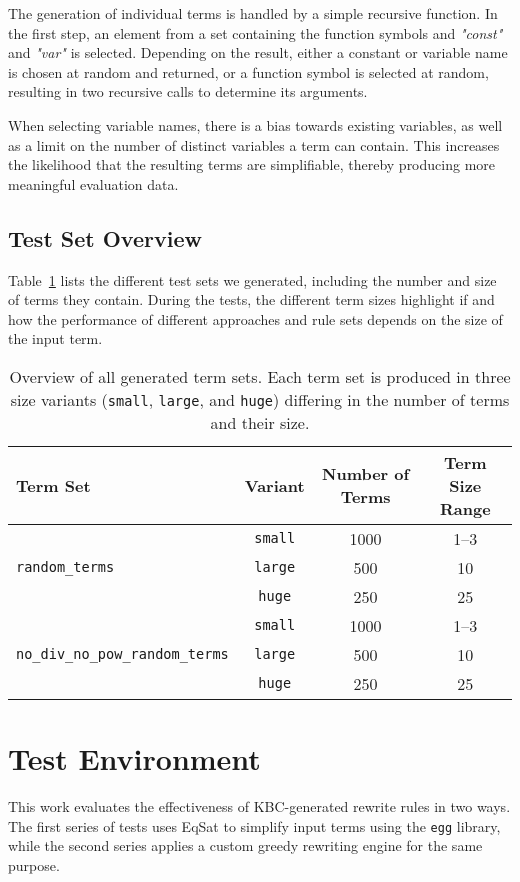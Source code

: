 The generation of individual terms is handled by a simple recursive function. In the first step, an element from a set containing the function symbols and \emph{"const"} and \emph{"var"} is selected. Depending on the result, either a constant or variable name is chosen at random and returned, or a function symbol is selected at random, resulting in two recursive calls to determine its arguments. 

When selecting variable names, there is a bias towards existing variables, as well as a limit on the number of distinct variables a term can contain. This increases the likelihood that the resulting terms are simplifiable, thereby producing more meaningful evaluation data.

\subsection{Test Set Overview}
Table~\ref{tab:term-sets-overview} lists the different test sets we generated, including the number and size of terms they contain. During the tests, the different term sizes highlight if and how the performance of different approaches and rule sets depends on the size of the input term.

\begin{table}[h]
	\centering
	\renewcommand{\arraystretch}{1.2}
	\begin{tabular}{lccc}
		\toprule
		\textbf{Term Set} & \textbf{Variant} & \textbf{Number of Terms} & \textbf{Term Size Range} \\
		\midrule
		\multirow{3}{*}{\texttt{random\_terms}} 
		& \texttt{small} & 1000 & 1--3 \\
		& \texttt{large} & 500 & 10 \\
		& \texttt{huge}  & 250 & 25 \\
		\midrule
		\multirow{3}{*}{\texttt{no\_div\_no\_pow\_random\_terms}} 
		& \texttt{small} & 1000 & 1--3 \\
		& \texttt{large} & 500 & 10 \\
		& \texttt{huge}  & 250 & 25 \\
		\bottomrule
	\end{tabular}
	\caption{Overview of all generated term sets. Each term set is produced in three size variants (\texttt{small}, \texttt{large}, and \texttt{huge}) differing in the number of terms and their size.}
	\label{tab:term-sets-overview}
\end{table}

\newpage
\section{Test Environment}
\label{sec:test-environment}
This work evaluates the effectiveness of KBC-generated rewrite rules in two ways. The first series of tests uses EqSat to simplify input terms using the \texttt{egg} library, while the second series applies a custom greedy rewriting engine for the same purpose. 

